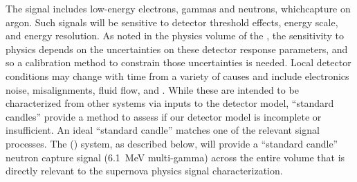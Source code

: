

The  signal includes low-energy  electrons, gammas and neutrons, %
whichcapture on argon. Such signals will be sensitive to  detector threshold effects, energy scale, and energy resolution. 
As noted in the physics volume of the , 
the sensitivity to  physics 
depends on the uncertainties on these detector response parameters, and so a calibration method to constrain those uncertainties is needed.
Local detector conditions may change with time from a variety of 
causes and include electronics noise, misalignments, fluid flow, and \efield. While these are intended to be characterized from other systems via inputs to the detector model, ``standard candles'' provide a method to assess if our detector model is incomplete or insufficient. An ideal ``standard candle'' matches one of the relevant signal processes. The  () system, as described below, will provide a ``standard candle'' neutron capture signal (\SI{6.1}{\MeV} multi-gamma) across the entire  volume that is directly relevant to the supernova physics signal characterization.



